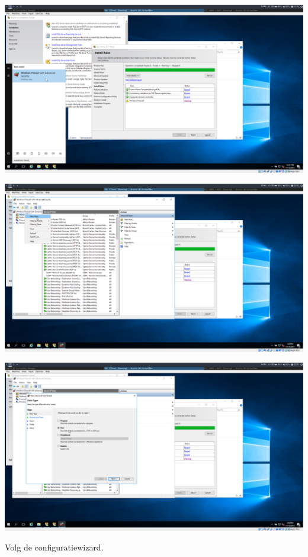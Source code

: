 \documentclass[a4paper]{article}
\begin{document}
\begin{center}
	\includegraphics[width=15cm]{Pictures/SQL/1542315570.png}
\end{center}
\begin{center}
	\includegraphics[width=15cm]{Pictures/SQL/1542315603.png}
\end{center}
\begin{center}
	\includegraphics[width=15cm]{Pictures/SQL/1542315607.png}
	
	Volg de configuratiewizard.
\end{center}
\end{document}
